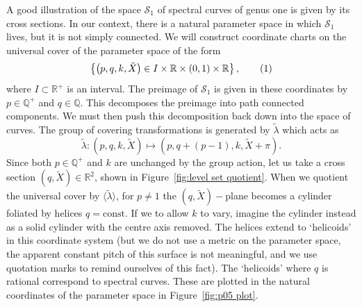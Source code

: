 \documentclass{article}
\numberwithin{equation}{section}
\numberwithin{figure}{section}
\newcommand{\labelthis}[1]{\addtocounter{equation}{1}\tag{\theequation}\label{#1}}
\newcommand{\bra}[1]{\left(#1\right)}
\newcommand{\Z}{\mathbb{Z}}
\newcommand{\Q}{\mathbb{Q}}
\newcommand{\R}{\mathbb{R}}
\begin{document}
A good illustration of the space $\mathcal{S}_1$ of spectral curves of genus one is given by its cross sections. In our context, there is a natural parameter space in which $\mathcal{S}_1$ lives, but it is not simply connected. We will construct coordinate charts on the universal cover of the parameter space of the form
\[
\left\{ \bra{p,q,k,\tilde{X}} \in I \times \R \times (0,1) \times \R \right\},
\labelthis{eqn:parameter demo}
\]
where $I\subset\R^+$ is an interval. The preimage of $\mathcal{S}_1$ is given in these coordinates by $p\in\Q^+$ and $q\in\Q$. 
This decomposes the preimage into path connected components. 
We must then push this decomposition back down into the space of curves.
The group of covering transformations is generated by $\tilde{\lambda}$ which acts as
\[
\tilde{\lambda} : \bra{p,q,k,\tilde{X}} \mapsto \bra{p,q + (p-1),k,\tilde{X} + \pi}.
\]
Since both $p\in\Q^+$ and $k$ are unchanged by the group action, let us take a cross section $(q,\tilde{X}) \in \R^2$, shown in Figure~\ref{fig:level set quotient}. When we quotient the universal cover by $\langle\tilde{\lambda}\rangle$, for $p\neq1$ the $(q,\tilde{X})-$plane becomes a cylinder foliated by helices $q=\text{const}$. If we to allow $k$ to vary, imagine the cylinder instead as a solid cylinder with the centre axis removed. The helices extend to `helicoids' in this coordinate system (but we do not use a metric on the parameter space, the apparent constant pitch of this surface is not meaningful, and we use quotation marks to remind ourselves of this fact). The `helicoids' where $q$ is rational correspond to spectral curves. These are plotted in the natural coordinates of the parameter space in Figure~\ref{fig:p05 plot}.
\end{document}
